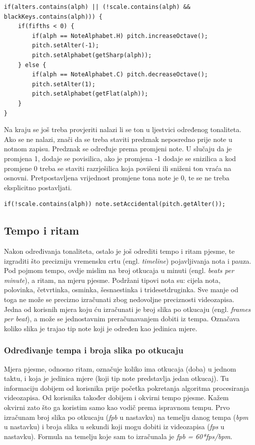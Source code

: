 \documentclass[times, utf8, zavrsni, numeric]{fer}
\begin{document}
\begin{lstlisting}
if(alters.contains(alph) || (!scale.contains(alph) && blackKeys.contains(alph))) {
	if(fifths < 0) {
		if(alph == NoteAlphabet.H) pitch.increaseOctave();
		pitch.setAlter(-1);
		pitch.setAlphabet(getSharp(alph));
	} else {
		if(alph == NoteAlphabet.C) pitch.decreaseOctave();
		pitch.setAlter(1);
		pitch.setAlphabet(getFlat(alph));
	}
}
\end{lstlisting}

Na kraju se još treba provjeriti nalazi li se ton u ljestvici određenog tonaliteta. Ako se ne nalazi, znači da se treba staviti predznak neposredno prije note u notnom zapisu. Predznak se određuje prema promjeni note. U slučaju da je promjena 1, dodaje se povisilica, ako je promjena -1 dodaje se snizilica a kod promjene 0 treba se staviti razrješilica koja povišeni ili sniženi ton vraća na osnovni. Pretpostavljena vrijednost promjene tona note je 0, te se ne treba eksplicitno postavljati.

\begin{lstlisting}
if(!scale.contains(alph)) note.setAccidental(pitch.getAlter());
\end{lstlisting}

\subsection{Tempo i ritam}
Nakon određivanja tonaliteta, ostalo je još odrediti tempo i ritam pjesme, te izgraditi što precizniju vremensku crtu (engl. \textit{timeline}) pojavljivanja nota i pauza. Pod pojmom tempo, ovdje mislim na broj otkucaja u minuti (engl. \textit{beats per minute}), a ritam, na mjeru pjesme. Podržani tipovi nota su: cijela nota, polovinka, četvrtinka, osminka, šesnaestinka i tridesetdruginka. Sve manje od toga ne može se precizno izračunati zbog nedovoljne preciznosti videozapisa. Jedna od korisnih mjera koju ću izračunati je broj slika po otkucaju (engl. \textit{frames per beat}), a može se jednostavnim preračunavanjem dobiti iz tempa. Označava koliko slika je trajao tip note koji je određen kao jedinica mjere.

\subsubsection{Određivanje tempa i broja slika po otkucaju}
Mjera pjesme, odnosno ritam, označuje koliko ima otkucaja (doba) u jednom taktu, i koja je jedinica mjere (koji tip note predstavlja jedan otkucaj). Tu informaciju dobijem od korisnika prije početka pokretanja algoritma procesiranja videozapisa. Od korisnika također dobijem i okvirni tempo pjesme. Kažem okvirni zato što ga koristim samo kao vodič prema ispravnom tempu. Prvo izračunam broj slika po otkucaju (\textit{fpb} u nastavku) na temelju danog tempa (\textit{bpm} u nastavku) i broja slika u sekundi koji mogu dobiti iz videozapisa (\textit{fps} u nastavku). Formula na temelju koje sam to izračunala je \textit{fpb = 60*fps/bpm}.
\end{document}
